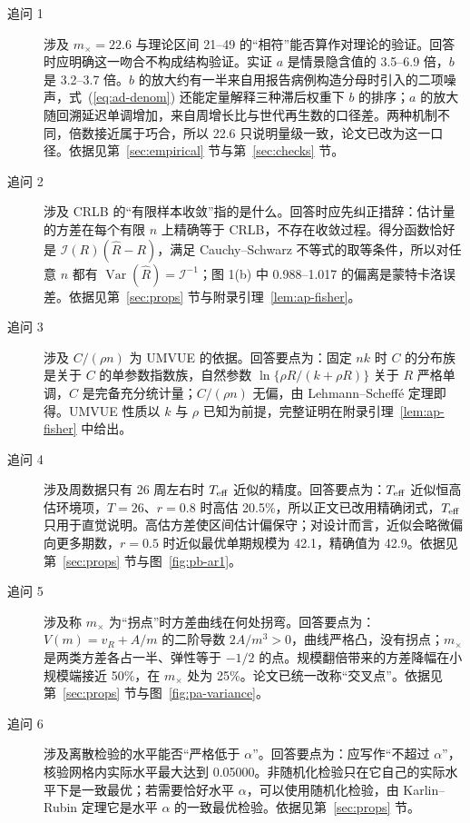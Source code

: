 \begin{description}
\item[追问 1] 涉及 $m_\times=22.6$ 与理论区间 21--49 的“相符”能否算作对理论的验证。回答时应明确这一吻合不构成结构验证。实证 $a$ 是情景隐含值的 3.5--6.9 倍，$b$ 是 3.2--3.7 倍。$b$ 的放大约有一半来自用报告病例构造分母时引入的二项噪声，式~(\ref{eq:ad-denom}) 还能定量解释三种滞后权重下 $b$ 的排序；$a$ 的放大随回溯延迟单调增加，来自周增长比与世代再生数的口径差。两种机制不同，倍数接近属于巧合，所以 22.6 只说明量级一致，论文已改为这一口径。依据见第~\ref{sec:empirical} 节与第~\ref{sec:checks} 节。

\item[追问 2] 涉及 CRLB 的“有限样本收敛”指的是什么。回答时应先纠正措辞：估计量的方差在每个有限 $n$ 上精确等于 CRLB，不存在收敛过程。得分函数恰好是 $\mathcal I(R)(\widehat R-R)$，满足 Cauchy--Schwarz 不等式的取等条件，所以对任意 $n$ 都有 $\operatorname{Var}(\widehat R)=\mathcal I^{-1}$；图 1(b) 中 0.988--1.017 的偏离是蒙特卡洛误差。依据见第~\ref{sec:props} 节与附录引理~\ref{lem:ap-fisher}。

\item[追问 3] 涉及 $C/(\rho n)$ 为 UMVUE 的依据。回答要点为：固定 $nk$ 时 $C$ 的分布族是关于 $C$ 的单参数指数族，自然参数 $\ln\{\rho R/(k+\rho R)\}$ 关于 $R$ 严格单调，$C$ 是完备充分统计量；$C/(\rho n)$ 无偏，由 Lehmann--Scheffé 定理即得。UMVUE 性质以 $k$ 与 $\rho$ 已知为前提，完整证明在附录引理~\ref{lem:ap-fisher} 中给出。

\item[追问 4] 涉及周数据只有 26 周左右时 $T_{\rm eff}$ 近似的精度。回答要点为：$T_{\rm eff}$ 近似恒高估环境项，$T=26$、$r=0.8$ 时高估 20.5\%，所以正文已改用精确闭式，$T_{\rm eff}$ 只用于直觉说明。高估方差使区间估计偏保守；对设计而言，近似会略微偏向更多期数，$r=0.5$ 时近似最优单期规模为 42.1，精确值为 42.9。依据见第~\ref{sec:props} 节与图~\ref{fig:pb-ar1}。

\item[追问 5] 涉及称 $m_\times$ 为“拐点”时方差曲线在何处拐弯。回答要点为：$V(m)=v_R+A/m$ 的二阶导数 $2A/m^3>0$，曲线严格凸，没有拐点；$m_\times$ 是两类方差各占一半、弹性等于 $-1/2$ 的点。规模翻倍带来的方差降幅在小规模端接近 50\%，在 $m_\times$ 处为 25\%。论文已统一改称“交叉点”。依据见第~\ref{sec:props} 节与图~\ref{fig:pa-variance}。

\item[追问 6] 涉及离散检验的水平能否“严格低于 $\alpha$”。回答要点为：应写作“不超过 $\alpha$”，核验网格内实际水平最大达到 0.05000。非随机化检验只在它自己的实际水平下是一致最优；若需要恰好水平 $\alpha$，可以使用随机化检验，由 Karlin--Rubin 定理它是水平 $\alpha$ 的一致最优检验。依据见第~\ref{sec:props} 节。


\end{description}
